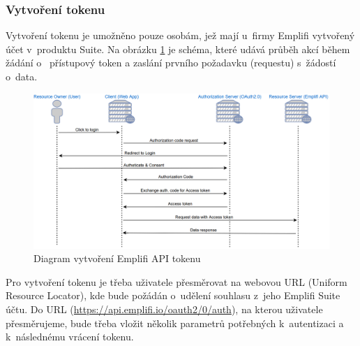 \documentclass[czech, bc, kiv, he, iso690numb, viewonly]{fasthesis} %
\begin{document}
\subsubsection{Vytvoření tokenu}

Vytvoření tokenu je umožněno pouze osobám, jež mají u~firmy Emplifi vytvořený účet v~produktu Suite. Na obrázku \ref{fig:emplifAPIDiagram} je schéma, které udává průběh akcí během žádání o~
přístupový token a zaslání prvního požadavku (requestu) s~žádostí o~data.
\begin{figure}
	\centering
	\includegraphics[width=1\textwidth]{pictures/emplifiAPI.png}
	\caption{Diagram vytvoření Emplifi API tokenu \cite{emplifiDocs}}
	\label{fig:emplifAPIDiagram}
\end{figure}

Pro vytvoření tokenu je třeba uživatele přesměrovat na webovou URL (Uniform Resource Locator), kde bude požádán o~udělení souhlasu z~jeho Emplifi Suite účtu.
Do URL (\url{https://api.emplifi.io/oauth2/0/auth}), na kterou uživatele přesměrujeme, bude třeba vložit několik parametrů potřebných k~autentizaci a k~následnému vrácení tokenu. 
\end{document}
